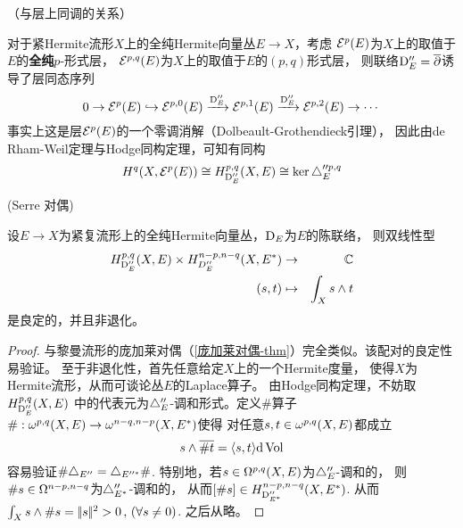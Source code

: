 \begin{rem}（与层上同调的关系）

对于紧Hermite流形$X$上的全纯Hermite向量丛$E\to X$，考虑
$\mathcal{E}^p(E)$为$X$上的取值于$E$的\textbf{全纯}$p$-形式层，
$\mathcal{E}^{p,q}(E)$为$X$上的取值于$E$的$(p,q)$形式层，
则联络$\mathrm{D}_E''=\overline{\partial}$诱导了层同态序列
$$
  0\to\mathcal{E}^p(E)\hookrightarrow
  \mathcal{E}^{p,0}(E)\xrightarrow{\mathrm{D}_E''}
  \mathcal{E}^{p,1}(E)\xrightarrow{\mathrm{D}_E''}
  \mathcal{E}^{p,2}(E)\to\cdots
$$
事实上这是层$\mathcal{E}^p(E)$的一个零调消解（Dolbeault-Grothendieck引理），
因此由de Rham-Weil定理与Hodge同构定理，可知有同构
$$
  H^q(X,\mathcal{E}^p(E))
  \cong H^{p,q}_{\mathrm{D}_E''}(X,E)
  \cong\ker\triangle_E''^{p,q}
$$
\end{rem}


\begin{thm}(Serre 对偶)

设$E\to X$为紧复流形上的全纯Hermite向量丛，$\mathrm{D}_E$为$E$的陈联络，
则双线性型
\begin{eqnarray*}
H^{p,q}_{\mathrm{D}_E''}(X,E) \times H^{n-p,n-q}_{D_E''}(X,E^*)&\to&\mathbb{C}\\
(s,t)&\mapsto&\int_X s\wedge t
\end{eqnarray*}
是良定的，并且非退化。
\end{thm}

\begin{proof}
与黎曼流形的庞加莱对偶（\ref{庞加莱对偶-thm}）完全类似。该配对的良定性易验证。
至于非退化性，首先任意给定$X$上的一个Hermite度量，
使得$X$为Hermite流形，从而可谈论丛$E$的Laplace算子。
由Hodge同构定理，不妨取$H^{p,q}_{\mathrm{D}_E''}(X,E)$
中的代表元为$\triangle_E''$-调和形式。定义$\#$算子
$\#:\omega^{p,q}(X,E)\to\omega^{n-q,n-p}(X,E^*)$使得
对任意$s,t\in\omega^{p,q}(X,E)$都成立
$$s\wedge\overline{\#t}=\langle s,t \rangle\mathrm{d}\operatorname{Vol}$$
容易验证$\#\triangle_{E''}=\triangle_{E''^*}\#$.
特别地，若$s\in\Omega^{p,q}(X,E)$为$\triangle_{E}''$-调和的，
则$\#s\in\Omega^{n-p,n-q}$为$\triangle_{E^*}''$-调和的，
从而$[\#s]\in H^{n-p,n-q}_{\mathrm{D}_{E^*}''}(X,E^*)$.
从而$\int_Xs\wedge\#s=|\!|s|\!|^2>0\,,\,(\forall s\neq 0)$.
之后从略。
\end{proof}

